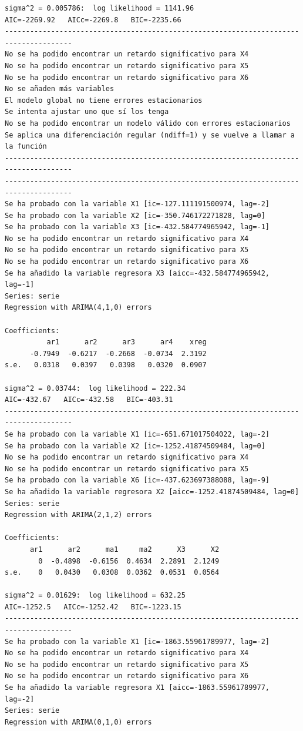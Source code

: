 \documentclass[
  12pt,
  a4paper]{article}
\begin{document}
\begin{verbatim}
sigma^2 = 0.005786:  log likelihood = 1141.96
AIC=-2269.92   AICc=-2269.8   BIC=-2235.66
--------------------------------------------------------------------------------------
No se ha podido encontrar un retardo significativo para X4
No se ha podido encontrar un retardo significativo para X5
No se ha podido encontrar un retardo significativo para X6
No se añaden más variables
El modelo global no tiene errores estacionarios
Se intenta ajustar uno que sí los tenga
No se ha podido encontrar un modelo válido con errores estacionarios
Se aplica una diferenciación regular (ndiff=1) y se vuelve a llamar a la función
--------------------------------------------------------------------------------------
--------------------------------------------------------------------------------------
Se ha probado con la variable X1 [ic=-127.111191500974, lag=-2]
Se ha probado con la variable X2 [ic=-350.746172271828, lag=0]
Se ha probado con la variable X3 [ic=-432.584774965942, lag=-1]
No se ha podido encontrar un retardo significativo para X4
No se ha podido encontrar un retardo significativo para X5
No se ha podido encontrar un retardo significativo para X6
Se ha añadido la variable regresora X3 [aicc=-432.584774965942, lag=-1]
Series: serie 
Regression with ARIMA(4,1,0) errors 

Coefficients:
          ar1      ar2      ar3      ar4    xreg
      -0.7949  -0.6217  -0.2668  -0.0734  2.3192
s.e.   0.0318   0.0397   0.0398   0.0320  0.0907

sigma^2 = 0.03744:  log likelihood = 222.34
AIC=-432.67   AICc=-432.58   BIC=-403.31
--------------------------------------------------------------------------------------
Se ha probado con la variable X1 [ic=-651.671017504022, lag=-2]
Se ha probado con la variable X2 [ic=-1252.41874509484, lag=0]
No se ha podido encontrar un retardo significativo para X4
No se ha podido encontrar un retardo significativo para X5
Se ha probado con la variable X6 [ic=-437.623697388088, lag=-9]
Se ha añadido la variable regresora X2 [aicc=-1252.41874509484, lag=0]
Series: serie 
Regression with ARIMA(2,1,2) errors 

Coefficients:
      ar1      ar2      ma1     ma2      X3      X2
        0  -0.4898  -0.6156  0.4634  2.2891  2.1249
s.e.    0   0.0430   0.0308  0.0362  0.0531  0.0564

sigma^2 = 0.01629:  log likelihood = 632.25
AIC=-1252.5   AICc=-1252.42   BIC=-1223.15
--------------------------------------------------------------------------------------
Se ha probado con la variable X1 [ic=-1863.55961789977, lag=-2]
No se ha podido encontrar un retardo significativo para X4
No se ha podido encontrar un retardo significativo para X5
No se ha podido encontrar un retardo significativo para X6
Se ha añadido la variable regresora X1 [aicc=-1863.55961789977, lag=-2]
Series: serie 
Regression with ARIMA(0,1,0) errors 


\end{verbatim}
\end{document}
